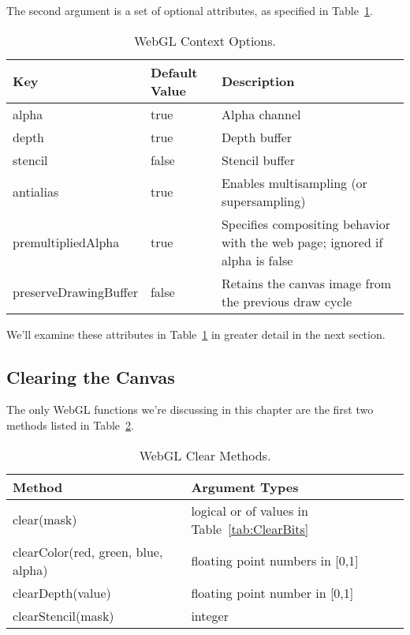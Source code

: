 The second argument is a set of optional attributes, as specified in Table~\ref{tab:ContextAttributes}.

\begin{table}[htb]\centering
  \begin{tabular}{lll}
    \hline
    Key & Default Value & Description \\
    \hline
    alpha & true & Alpha channel \\
    depth & true & Depth buffer \\
    stencil & false & Stencil buffer \\
    antialias & true & Enables multisampling (or supersampling) \\
    premultipliedAlpha & true & Specifies compositing behavior with the web page; ignored if alpha is false \\
    preserveDrawingBuffer & false & Retains the canvas image from the previous draw cycle \\
    \hline
  \end{tabular}
  \caption{WebGL Context Options.}
  \label{tab:ContextAttributes}
\end{table}

We'll examine these attributes in Table~\ref{tab:ContextAttributes} in greater detail in the next section.


\subsection{Clearing the Canvas}

The only WebGL functions we're discussing in this chapter are the first two methods listed in Table~\ref{tab:Clearing}.

\begin{table}[htb]\centering
  \begin{tabular}{ll}
    \hline
    Method & Argument Types \\
    \hline
    clear(mask) & logical or of values in Table~\ref{tab:ClearBits} \\
    clearColor(red, green, blue, alpha)  & floating point numbers in [0,1] \\
    clearDepth(value) & floating point number in [0,1] \\
    clearStencil(mask) & integer \\
    \hline
  \end{tabular}
  \caption{WebGL Clear Methods.}
  \label{tab:Clearing}
\end{table}

